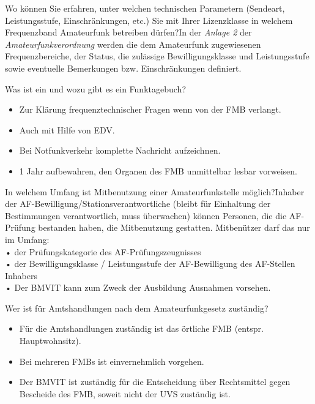 \documentclass[avery5371,grid,frame,a4paper]{flashcards}
\newcommand{\card}[3]{
  \begin{flashcard}[{\chap} -- #1]{#2}#3\end{flashcard}
}
\begin{document}
\card{34}{Wo können Sie erfahren, unter welchen technischen Parametern (Sendeart, Leistungsstufe, Einschränkungen, etc.) Sie mit Ihrer Lizenzklasse in welchem Frequenzband Amateurfunk betreiben dürfen?}{In der \emph{Anlage 2} der \emph{Amateurfunkverordnung}
werden die dem Amateurfunk zugewiesenen Frequenzbereiche, der Status, die zulässige Bewilligungsklasse und Leistungsstufe sowie eventuelle Bemerkungen bzw. Einschränkungen definiert.}

\card{35}{Was ist ein und wozu gibt es ein Funktagebuch?}{\begin{itemize}\itemsep0pt \item Zur Klärung frequenztechnischer Fragen wenn von der FMB verlangt. \item Auch mit Hilfe von EDV. \item Bei Notfunkverkehr komplette Nachricht aufzeichnen. \item 1 Jahr aufbewahren, den Organen des FMB unmittelbar lesbar vorweisen. \end{itemize}}

\card{36}{In welchem Umfang ist Mitbenutzung einer Amateurfunkstelle möglich?}{Inhaber der AF-Bewilligung/Stationsverantwortliche (bleibt für Einhaltung der Bestimmungen verantwortlich, muss überwachen) können Personen, die die AF-Prüfung bestanden haben, die Mitbenutzung gestatten. Mitbenützer darf das nur im Umfang: \\ • der Prüfungskategorie des AF-Prüfungszeugnisses \\ • der Bewilligungsklasse / Leistungsstufe der AF-Bewilligung des AF-Stellen Inhabers \\ • Der BMVIT kann zum Zweck der Ausbildung Ausnahmen vorsehen.}

\card{37}{Wer ist für Amtshandlungen nach dem Amateurfunkgesetz zuständig?}{\begin{itemize}\itemsep1pt \item Für die Amtshandlungen zuständig ist das örtliche FMB (entspr. Hauptwohnsitz). \item Bei mehreren FMBs ist einvernehmlich vorgehen. \item Der BMVIT ist zuständig für die Entscheidung über Rechtsmittel gegen Bescheide des FMB, soweit nicht der UVS
zuständig ist.\end{itemize}}
\end{document}
